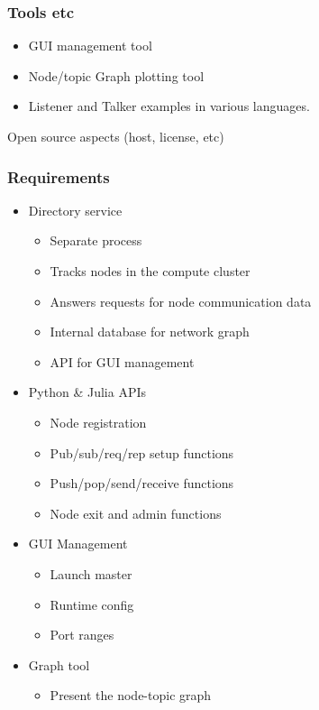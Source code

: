 \documentclass[xcolor=svgnames]{beamer}
\begin{document}
\begin{frame}[fragile]
  \frametitle{Tools etc}

\begin{itemize}
\item GUI management tool
\item Node/topic Graph plotting tool
\item Listener and Talker examples in various languages.
\end{itemize}
\vfill

Open source aspects (host, license, etc)

\end{frame}



\begin{frame}[fragile]
  \frametitle{Requirements}

\begin{itemize}
\item Directory service 
\begin{itemize}
\item  Separate process
\item  Tracks nodes in the compute cluster
\item  Answers requests for node communication data
\item  Internal database for network graph
\item  API for GUI management
\end{itemize}
\item Python \& Julia APIs
\begin{itemize}
\item Node registration 
\item Pub/sub/req/rep setup functions
\item Push/pop/send/receive functions
\item Node exit and admin functions
\end{itemize}
\item GUI Management
\begin{itemize}
\item  Launch master
\item  Runtime config
\item  Port ranges
\end{itemize}
\item Graph tool
\begin{itemize}
\item Present the node-topic graph
\end{itemize}
\end{itemize}


\end{frame}
\end{document}
